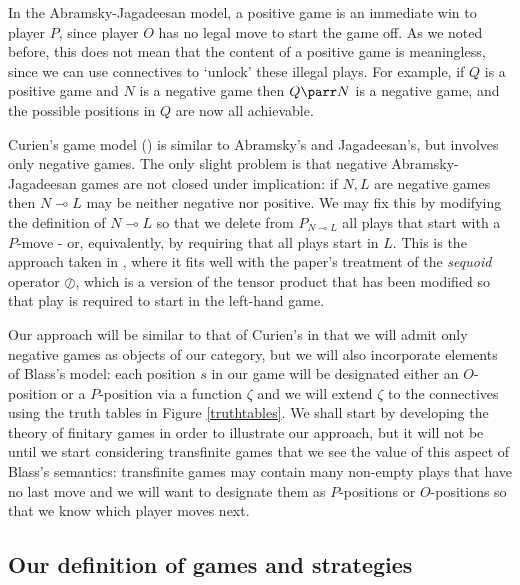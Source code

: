 \documentclass[11pt]{article} %
\theoremstyle{plain} %
\theoremstyle{definition} %
\theoremstyle{note}
\theoremstyle{exercisestyle}
\newcommand{\sequoid}{\oslash}
\renewcommand{\implies}{\multimap}
\begin{document}
In the Abramsky-Jagadeesan model, a positive game is an immediate win to player $P$, since player $O$ has no legal move to start the game off.  As we noted before, this does not mean that the content of a positive game is meaningless, since we can use connectives to `unlock' these illegal plays.  For example, if $Q$ is a positive game and $N$ is a negative game then $Q\parr N$ is a negative game, and the possible positions in $Q$ are now all achievable.  

Curien's game model (\cite{curiengames}) is similar to Abramsky's and Jagadeesan's, but involves only negative games.  The only slight problem is that negative Abramsky-Jagadeesan games are not closed under implication: if $N,L$ are negative games then $N\implies L$ may be neither negative nor positive.  We may fix this by modifying the definition of $N\implies L$ so that we delete from $P_{N\implies L}$ all plays that start with a $P$-move - or, equivalently, by requiring that all plays start in $L$.  This is the approach taken in \cite{martinsthesis}, where it fits well with the paper's treatment of the \emph{sequoid} operator $\sequoid$, which is a version of the tensor product that has been modified so that play is required to start in the left-hand game.

Our approach will be similar to that of Curien's in that we will admit only negative games as objects of our category, but we will also incorporate elements of Blass's model: each position $s$ in our game will be designated either an $O$-position or a $P$-position via a function $\zeta$ and we will extend $\zeta$ to the connectives using the truth tables in Figure \ref{truthtables}.  We shall start by developing the theory of finitary games in order to illustrate our approach, but it will not be until we start considering transfinite games that we see the value of this aspect of Blass's semantics: transfinite games may contain many non-empty plays that have no last move and we will want to designate them as $P$-positions or $O$-positions so that we know which player moves next.  

\subsection{Our definition of games and strategies}
\end{document}
